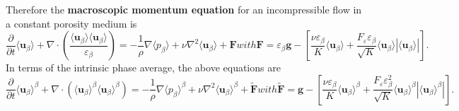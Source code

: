 \documentclass[a4paper, 11pt]{report}
\begin{document}
Therefore the \textbf{macroscopic momentum equation} for an incompressible flow in a constant porosity medium is
\begin{subequations} \label{eq:2.22}
\begin{equation}
    \boxed{\frac{\partial}{\partial t}\langle\mathbf{u}_{\beta}\rangle + \nabla\cdot\left(\frac{\langle\mathbf{u}_{\beta}\rangle\langle\mathbf{u}_{\beta}\rangle}{\varepsilon_\beta}\right) = -\frac{1}{\rho}\nabla\langle p_{\beta}\rangle + \nu\nabla^2\langle\mathbf{u}_{\beta}\rangle + \mathbf{F}} \label{eq:2.22a}
\end{equation}
with
\begin{equation}
    \boxed{\mathbf{F} = \varepsilon_\beta\mathbf{g} - \left[\frac{\nu\varepsilon_\beta}{K}\langle\mathbf{u}_\beta\rangle + \frac{F_\varepsilon\varepsilon_\beta}{\sqrt{K}}\langle\mathbf{u}_\beta\rangle\left|\langle\mathbf{u}_\beta\rangle\right|\right].} \label{eq:2.22b}
\end{equation}
\end{subequations}
In terms of the intrinsic phase average, the above equations are
\begin{subequations}
\begin{equation}
    \frac{\partial}{\partial t}\langle\mathbf{u}_\beta\rangle^\beta + \nabla\cdot\left(\langle\mathbf{u}_\beta\rangle^\beta\langle\mathbf{u}_\beta\rangle^\beta\right) = -\frac{1}{\rho}\nabla\langle p_\beta\rangle^\beta + \nu\nabla^2\langle\mathbf{u}_\beta\rangle^\beta + \mathbf{\tilde{F}} \label{eq:2.23a}
\end{equation}
with
\begin{equation}
    \mathbf{\tilde{F}} = \mathbf{g} - \left[\frac{\nu\varepsilon_\beta}{K}\langle\mathbf{u}_\beta\rangle^\beta + \frac{F_\varepsilon\varepsilon_\beta^2}{\sqrt{K}}\langle\mathbf{u}_\beta\rangle^\beta|\langle\mathbf{u}_\beta\rangle^\beta|\right]. \label{eq:2.23b}
\end{equation}
\end{subequations} \label{eq:2.23}


\end{document}
